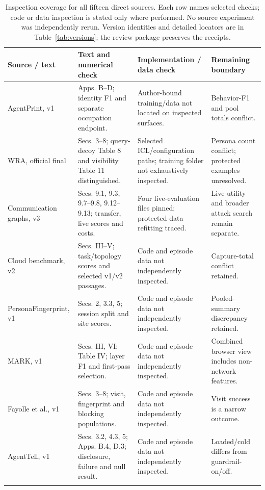 \begin{table}[!tp]\centering\footnotesize
\caption{Inspection coverage for all fifteen direct sources. Each row names selected checks; code or data inspection is stated only where performed. No source experiment was independently rerun. Version identities and detailed locators are in Table~\ref{tab:versions}; the review package preserves the receipts.}
\label{tab:check-coverage}
\renewcommand{\arraystretch}{1.1}
\begin{tabularx}{\textwidth}{@{}P{.17\textwidth}P{.32\textwidth}P{.25\textwidth}Y@{}}\toprule
Source / text & Text and numerical check & Implementation / data check & Remaining boundary \\\midrule
AgentPrint, v1 & Apps. B--D; identity F1 and separate occupation endpoint. & Author-bound training/data not located on inspected surfaces. & Behavior-F1 and pool totals conflict. \\\addlinespace[3pt]
WRA, official final & Secs. 3--8; query-decoy Table 8 and visibility Table 11 distinguished. & Selected ICL/configuration paths; training folder not exhaustively inspected. & Persona count conflict; protected examples unresolved. \\\addlinespace[3pt]
Communication graphs, v3 & Secs. 9.1, 9.3, 9.7--9.8, 9.12--9.13; transfer, live scores and costs. & Four live-evaluation files pinned; protected-data refitting traced. & Live utility and broader attack search remain separate. \\\addlinespace[3pt]
Cloud benchmark, v2 & Secs. III--V; task/topology scores and selected v1/v2 passages. & Code and episode data not independently inspected. & Capture-total conflict retained. \\\addlinespace[3pt]
PersonaFingerprint, v1 & Secs. 2, 3.3, 5; session split and site scores. & Code and episode data not independently inspected. & Pooled-summary discrepancy retained. \\\addlinespace[3pt]
MARK, v1 & Secs. III, VI; Table IV; layer F1 and first-pass selection. & Code and episode data not independently inspected. & Combined browser view includes non-network features. \\\addlinespace[3pt]
Fayolle et al., v1 & Secs. 3--8; visit, fingerprint and blocking populations. & Code and episode data not independently inspected. & Visit success is a narrow outcome. \\\addlinespace[3pt]
AgentTell, v1 & Secs. 3.2, 4.3, 5; Apps. B.4, D.3; disclosure, failure and null result. & Code and episode data not independently inspected. & Loaded/cold differs from guardrail-on/off. \\\addlinespace[3pt]

\end{tabularx}
\end{table}
